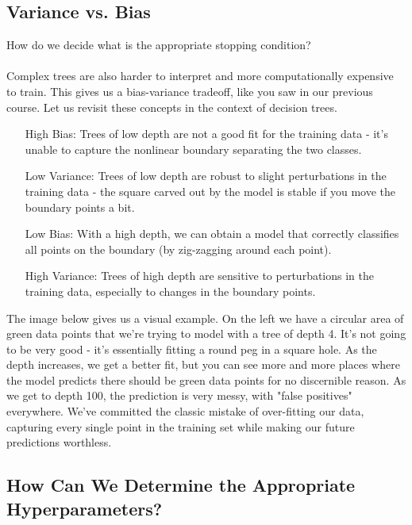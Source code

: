 \documentclass[10pt,a4paper]{report}
\begin{document}
\subsection{Variance vs. Bias}
How do we decide what is the appropriate stopping condition?\\\\
Complex trees are also harder to interpret and more computationally expensive to train. This gives us a bias-variance tradeoff, like you saw in our previous course. Let us revisit these concepts in the context of decision trees.
\begin{itemize}
\item[High Bias:]Trees of low depth are not a good fit for the training data - it’s unable to capture the nonlinear boundary separating the two classes.
\item[Low Variance:]Trees of low depth are robust to slight perturbations in the training data - the square carved out by the model is stable if you move the boundary points a bit.
\item[Low Bias:] With a high depth, we can obtain a model that correctly classifies all points on the boundary (by zig-zagging around each point).
\item[High Variance:]Trees of high depth are sensitive to perturbations in the training data, especially to changes in the boundary points.
\end{itemize}
The image below gives us a visual example. On the left we have a circular area of green data points that we're trying to model with a tree of depth 4. It's not going to be very good - it's essentially fitting a round peg in a square hole. As the depth increases, we get a better fit, but you can see more and more places where the model predicts there should be green data points for no discernible reason. As we get to depth 100, the prediction is very messy, with "false positives" everywhere. We've committed the classic mistake of over-fitting our data, capturing every single point in the training set while making our future predictions worthless.\\
\subsection*{How Can We Determine the Appropriate Hyperparameters?}
\end{document}
